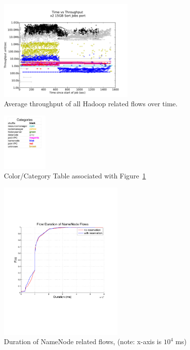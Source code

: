 \begin{figure}
\centering
\includegraphics[width=0.6\textwidth]{figures/clock_v_throughput_port.pdf}
\caption{Average throughput of all Hadoop related flows over time.}
\label{fig:tput}
\end{figure}

\begin{figure}
\centering
\includegraphics[width=0.2\textwidth]{figures/categories.pdf}
\caption{Color/Category Table associated with Figure~\ref{fig:tput}}
\label{fig:cats}
\end{figure}

\begin{figure}
\centering
\includegraphics[width=0.55\textwidth]{figures/flow_durations.pdf}
\caption{Duration of NameNode related flows, (note: x-axis is $10^4$ ms)}
\label{fig:duration_cdf}
\end{figure}

